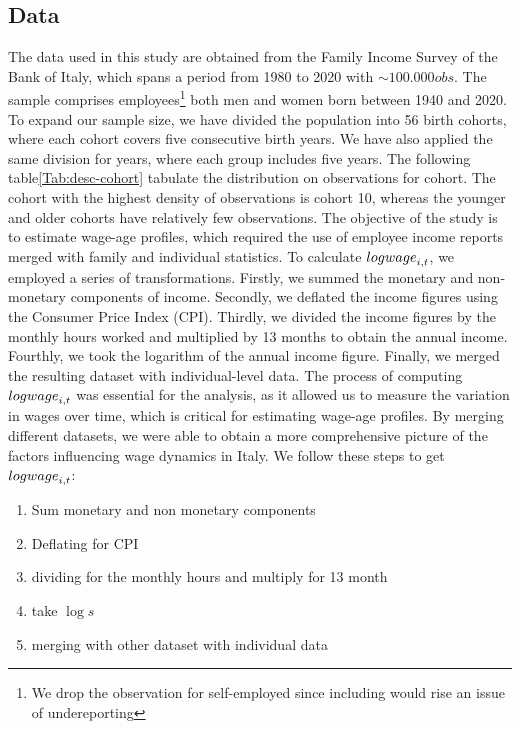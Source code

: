 \documentclass[12pt]{article}
\begin{document}
\subsection{Data}
The data used in this study are obtained from the Family Income Survey of the Bank of Italy, which spans a period from
1980 to 2020 with $\sim100.000 obs$. The sample comprises employees\footnote{We drop the observation for self-employed
since including would rise an issue of undereporting} both men and women born between 1940 and 2020. To expand our
sample size, we have divided the population into 56 birth cohorts, where each cohort covers five consecutive birth
years. We have also applied the same division for years, where each group includes five years. The following
table\ref{Tab:desc-cohort} tabulate the distribution on observations for cohort. The cohort with the highest density of
observations is cohort 10, whereas the younger and older cohorts have relatively few observations. The objective of the
study is to estimate wage-age profiles, which required the use of employee income reports merged with family and
individual statistics. To calculate $\\log{wage}_{i,t}$, we employed a series of transformations. Firstly, we summed the
monetary and non-monetary components of income. Secondly, we deflated the income figures using the Consumer Price Index
(CPI). Thirdly, we divided the income figures by the monthly hours worked and multiplied by 13 months to obtain the
annual income. Fourthly, we took the logarithm of the annual income figure. Finally, we merged the resulting dataset
with individual-level data.
\newline
The process of computing $\\log{wage}_{i,t}$ was essential for the analysis, as it allowed us to measure the variation
in wages over time, which is critical for estimating wage-age profiles. By merging different datasets, we were able to
obtain a more comprehensive picture of the factors influencing wage dynamics in Italy. We follow these steps to get
$\\log{wage}_{i,t}$:
\begin{enumerate}
    \item Sum monetary and non monetary components 
    \item Deflating for CPI
    \item dividing for the monthly hours and multiply for 13 month
    \item take $\log{s}$
    \item merging with other dataset with individual data
\end{enumerate}
\end{document}
